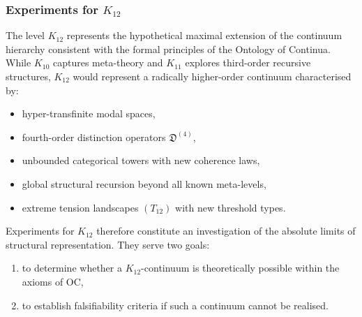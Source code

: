 
\subsubsection{Experiments for $K_{12}$}
\label{sec:experiments-k12}

The level $K_{12}$ represents the hypothetical maximal extension of
the continuum hierarchy consistent with the formal principles of the
Ontology of Continua.
While $K_{10}$ captures meta-theory and $K_{11}$ explores
third-order recursive structures, $K_{12}$ would represent a
radically higher-order continuum characterised by:

\begin{itemize}
    \item hyper-transfinite modal spaces,
    \item fourth-order distinction operators $\mathfrak{D}^{(4)}$,
    \item unbounded categorical towers with new coherence laws,
    \item global structural recursion beyond all known meta-levels,
    \item extreme tension landscapes $(T_{12})$ with new threshold types.
\end{itemize}

Experiments for $K_{12}$ therefore constitute an investigation of the
absolute limits of structural representation.
They serve two goals:

\begin{enumerate}
    \item to determine whether a $K_{12}$-continuum is theoretically
          possible within the axioms of OC,
    \item to establish falsifiability criteria if such a continuum
          cannot be realised.
\end{enumerate}



